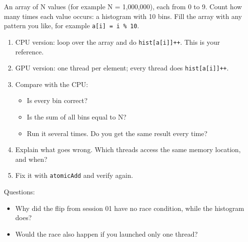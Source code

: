 \documentclass[main.tex]{subfiles}
\begin{document}
An array of N values (for example N = 1,000,000), each from 0 to 9.
Count how many times each value occurs: a histogram with 10 bins.
Fill the array with any pattern you like, for example \texttt{a[i] = i \% 10}.

\begin{enumerate}[nosep]
  \item CPU version: loop over the array and do \texttt{hist[a[i]]++}. This is your reference.
  \item GPU version: one thread per element; every thread does \texttt{hist[a[i]]++}.
  \item Compare with the CPU:
    \begin{itemize}[nosep]
      \item Is every bin correct?
      \item Is the sum of all bins equal to N?
      \item Run it several times. Do you get the same result every time?
    \end{itemize}
  \item Explain what goes wrong. Which threads access the same memory location, and when?
  \item Fix it with \texttt{atomicAdd} and verify again.
\end{enumerate}

Questions:
\begin{itemize}[nosep]
  \item Why did the flip from session 01 have no race condition, while the histogram does?
  \item Would the race also happen if you launched only one thread?
\end{itemize}
\end{document}
